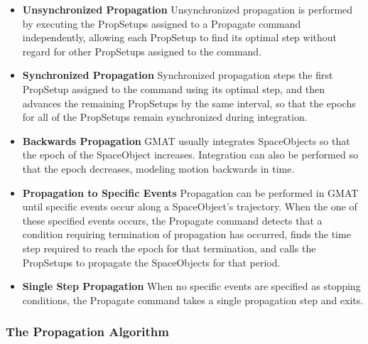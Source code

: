 \begin{itemize}
\item \textbf{Unsynchronized Propagation}  Unsynchronized propagation is performed by executing the
PropSetups assigned to a Propagate command independently, allowing each PropSetup to find its
optimal step without regard for other PropSetups assigned to the command.
\item \textbf{Synchronized Propagation}  Synchronized propagation steps the first PropSetup
assigned to the command using its optimal step, and then advances the remaining PropSetups by the
same interval, so that the epochs for all of the PropSetups remain synchronized during integration.
\item \textbf{Backwards Propagation}  GMAT usually integrates SpaceObjects so that the epoch of the
SpaceObject increases.  Integration can also be performed so that the epoch decreases, modeling
motion backwards in time.
\item \textbf{Propagation to Specific Events}  Propagation can be performed
in GMAT until specific events occur along a SpaceObject's trajectory.  When the one of these
specified events occurs, the Propagate command detects that a condition requiring termination of
propagation has occurred, finds the time step required to reach the epoch for that termination, and
calls the PropSetups to propagate the SpaceObjects for that period.
\item \textbf{Single Step Propagation}  When no specific events are specified as stopping
conditions, the Propagate command takes a single propagation step and exits.
\end{itemize}

\subsubsection{The Propagation Algorithm}

